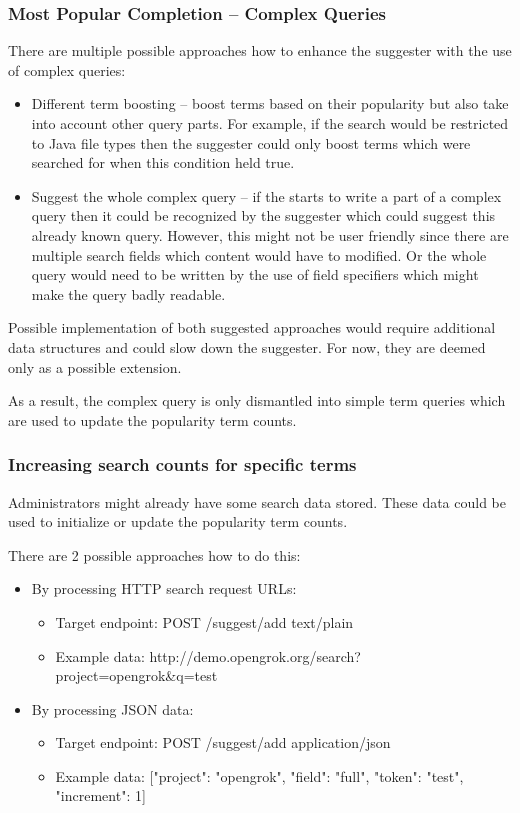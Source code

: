 \subsubsection{Most Popular Completion – Complex Queries}
\label{previous_searches}
There are multiple possible approaches how to enhance the suggester with the use of complex queries:
\begin{itemize}
    \item Different term boosting – boost terms based on their popularity but also take into account other
    query parts. For example, if the search would be restricted to Java file types then the suggester could
    only boost terms which were searched for when this condition held true.
    \item Suggest the whole complex query – if the starts to write a part of a complex query then it could be recognized
    by the suggester which could suggest this already known query. However, this might not be user friendly since there
    are multiple search fields which content would have to modified. Or the whole query would need to be written by the
    use of field specifiers which might make the query badly readable.
\end{itemize}

Possible implementation of both suggested approaches would require additional data structures and could slow down the
suggester. For now, they are deemed only as a possible extension.

As a result, the complex query is only dismantled into simple term queries which are used to update the popularity term counts.

\subsubsection{Increasing search counts for specific terms}
Administrators might already have some search data stored. These data could be used to initialize or update the
popularity term counts.

There are 2 possible approaches how to do this:
\begin{itemize}
    \item By processing HTTP search request URLs:
        \begin{itemize}
            \item Target endpoint: POST /suggest/add text/plain
            \item Example data:
            http://demo.opengrok.org/search?project=opengrok\&q=test
        \end{itemize}
    \item By processing JSON data:
        \begin{itemize}
            \item Target endpoint: POST /suggest/add application/json
            \item Example data: [{"project": "opengrok", "field": "full", "token": "test", "increment": 1}]
        \end{itemize}
\end{itemize}

